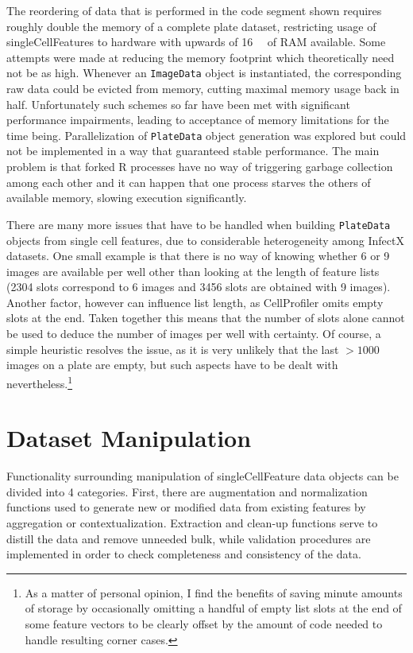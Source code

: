 The reordering of data that is performed in the code segment shown requires roughly double the memory of a complete plate dataset, restricting usage of singleCellFeatures to hardware with upwards of \SI{16}{\giga\byte} of RAM available. Some attempts were made at reducing the memory footprint which theoretically need not be as high. Whenever an \texttt{ImageData} object is instantiated, the corresponding raw data could be evicted from memory, cutting maximal memory usage back in half. Unfortunately such schemes so far have been met with significant performance impairments, leading to acceptance of memory limitations for the time being. Parallelization of \texttt{PlateData} object generation was explored but could not be implemented in a way that guaranteed stable performance. The main problem is that forked R processes have no way of triggering garbage collection among each other and it can happen that one process starves the others of available memory, slowing execution significantly.

There are many more issues that have to be handled when building \texttt{PlateData} objects from single cell features, due to considerable heterogeneity among InfectX datasets. One small example is that there is no way of knowing whether 6 or 9 images are available per well other than looking at the length of feature lists (2304 slots correspond to 6 images and 3456 slots are obtained with 9 images). Another factor, however can influence list length, as CellProfiler omits empty slots at the end. Taken together this means that the number of slots alone cannot be used to deduce the number of images per well with certainty. Of course, a simple heuristic resolves the issue, as it is very unlikely that the last $>1000$ images on a plate are empty, but such aspects have to be dealt with nevertheless.\footnote{As a matter of personal opinion, I find the benefits of saving minute amounts of storage by occasionally omitting a handful of empty list slots at the end of some feature vectors to be clearly offset by the amount of code needed to handle resulting corner cases.}

\section{Dataset Manipulation}
Functionality surrounding manipulation of singleCellFeature data objects can be divided into 4 categories. First, there are augmentation and normalization functions used to generate new or modified data from existing features by aggregation or contextualization. Extraction and clean-up functions serve to distill the data and remove unneeded bulk, while validation procedures are implemented in order to check completeness and consistency of the data.

